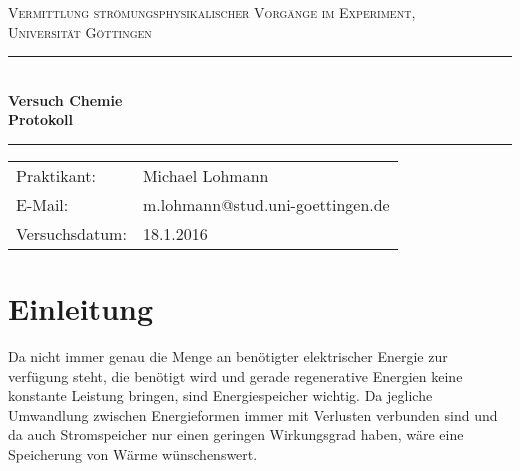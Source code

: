 \documentclass[12pt,a4paper,titlepage,headinclude,bibtotoc]{scrartcl}
\begin{document}
\begin{titlepage}
\centering
\textsc{\Large Vermittlung strömungsphysikalischer Vorgänge im Experiment,
\\[1.5ex] Universität Göttingen}

\vspace*{3cm}

\rule{\textwidth}{1pt}\\[0.5cm]
{\huge \bfseries
  Versuch Chemie  \\[1.5ex]
  Protokoll}\\[0.5cm]
\rule{\textwidth}{1pt}

\vspace*{3cm}

\begin{Large}
\begin{tabular}{ll}
Praktikant: &  Michael Lohmann\\
 E-Mail: & m.lohmann@stud.uni-goettingen.de\\
 Versuchsdatum: & 18.1.2016\\
\end{tabular}
\end{Large}

\vspace*{0.8cm}

\begin{Large}
\end{Large}

\end{titlepage}

\tableofcontents

\newpage


\section{Einleitung}
Da nicht immer genau die Menge an benötigter elektrischer Energie zur verfügung steht, die benötigt wird und gerade regenerative Energien keine konstante Leistung bringen, sind Energiespeicher wichtig.
Da jegliche Umwandlung zwischen Energieformen immer mit Verlusten verbunden sind und da auch Stromspeicher nur einen geringen Wirkungsgrad haben, wäre eine Speicherung von Wärme wünschenswert.
\end{document}
